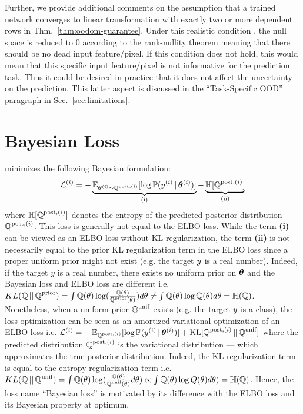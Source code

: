 Further, we provide additional comments on the assumption that a trained network converges to linear transformation with exactly two or more dependent rows in Thm.~\ref{thm:oodom-guarantee}. Under this realistic condition \cite{overconfident-relu}, the null space is reduced to $0$ according to the rank-nullity theorem meaning that there should be no dead input feature/pixel. If this condition does not hold, this would mean that this specific input feature/pixel is not informative for the prediction task. Thus it could be desired in practice that it does not affect the uncertainty on the prediction. This latter aspect is discussed in the “Task-Specific OOD” paragraph in Sec.~\ref{sec:limitations}.

\section{Bayesian Loss} 
\label{sec:loss}

\NatPNacro{} minimizes the following Bayesian formulation:
%
\begin{equation}
    \mathcal{L}^{(i)} = - \underbrace{\operatorname{\mathbb{E}}_{\bm{\theta}^{(i)} \sim \operatorname{\mathbb{Q}}^{\text{post},(i)}}[\log \mathbb{P}(y^{(i)}\,|\, \bm{\theta} ^{(i)})]}_\text{(i)} - \underbrace{\operatorname{\mathbb{H}}[\operatorname{\mathbb{Q}}^{\text{post},(i)}]}_\text{(ii)}
\end{equation}
%
where $\operatorname{\mathbb{H}}[\operatorname{\mathbb{Q}}^{\text{post},(i)}]$ denotes the entropy of the predicted posterior distribution $\operatorname{\mathbb{Q}}^{\text{post},(i)}$. This loss is generally not equal to the ELBO loss. While the term \textbf{(i)} can be viewed as an ELBO loss without KL regularization, the term \textbf{(ii)} is not necessarily equal to the prior KL regularization term in the ELBO loss since a proper uniform prior might not exist (e.g. the target $y$ is a real number). Indeed, if the target $y$ is a real number, there exists no uniform prior on $\bm{\theta}$ and the Bayesian loss and ELBO loss are different i.e. $KL(\operatorname{\mathbb{Q}}||\operatorname{\mathbb{Q}}^\text{prior}) = \int \operatorname{\mathbb{Q}}(\theta) \log (\frac{\operatorname{\mathbb{Q}}(\theta)}{\operatorname{\mathbb{Q}}^\text{prior}(\theta)}) d\theta \neq \int \operatorname{\mathbb{Q}}(\theta) \log \operatorname{\mathbb{Q}}(\theta) d\theta = \operatorname{\mathbb{H}}(\operatorname{\mathbb{Q}})$. Nonetheless, when a uniform prior $\operatorname{\mathbb{Q}}^\text{unif}$ exists (e.g. the target $y$ is a class), the loss optimization can be seen as an amortized variational optimization of an ELBO loss \citep{amortized-variational-inference} i.e. $\mathcal{L}^{(i)} = - \operatorname{\mathbb{E}}_{\operatorname{\mathbb{Q}}^{\text{post},(i)}}[\log \mathbb{P}(y^{(i)}\,|\, \bm{\theta} ^{(i)})] + \text{KL}[\operatorname{\mathbb{Q}}^{\text{post},(i)}\|\operatorname{\mathbb{Q}}^\text{unif}]$ where the predicted distribution $\operatorname{\mathbb{Q}}^{\text{post},(i)}$ is the variational distribution --- which approximates the true posterior distribution. Indeed, the KL regularization term is equal to the entropy regularization term i.e. $KL(\operatorname{\mathbb{Q}}||\operatorname{\mathbb{Q}}^\text{unif}) = \int \operatorname{\mathbb{Q}}(\theta) \log (\frac{\operatorname{\mathbb{Q}}(\theta)}{\operatorname{\mathbb{Q}}^\text{unif}(\theta)} d\theta) \propto \int \operatorname{\mathbb{Q}}(\theta) \log Q(\theta) d\theta) = \operatorname{\mathbb{H}}(\operatorname{\mathbb{Q}})$. Hence, the loss name ``Bayesian loss'' \citep{postnet} is motivated by its difference with the ELBO loss and its Bayesian property at optimum.

